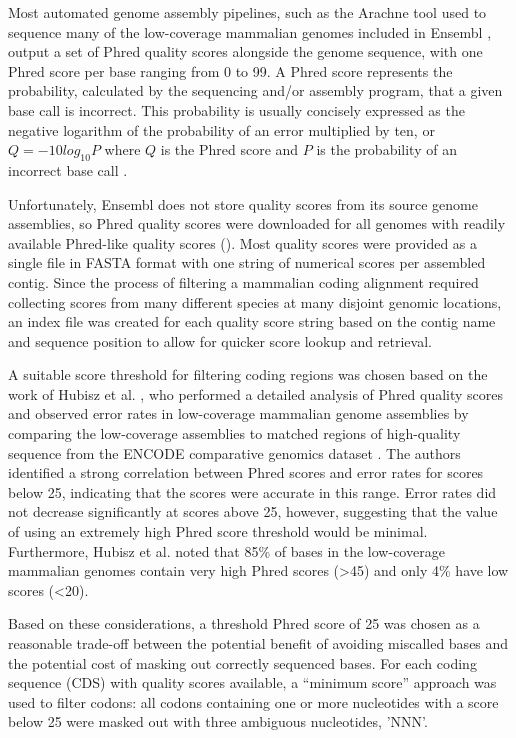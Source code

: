Most automated genome assembly pipelines, such as the Arachne tool
used to sequence many of the low-coverage mammalian genomes included
in Ensembl \citep{Jaffe2003}, output a set of Phred quality scores
alongside the genome sequence, with one Phred score per base ranging
from 0 to 99. A Phred score represents the probability, calculated by
the sequencing and/or assembly program, that a given base call is
incorrect. This probability is usually concisely expressed as the
negative logarithm of the probability of an error multiplied by ten,
or $Q = -10log_{10}P$ where $Q$ is the Phred score and $P$ is the
probability of an incorrect base call \citep{Cock2010}.

Unfortunately, Ensembl does not store quality scores from its source
genome assemblies, so Phred quality scores were downloaded for all
genomes with readily available Phred-like quality scores (). Most quality
scores were provided as a single file in FASTA format with one string
of numerical scores per assembled contig. Since the process of
filtering a mammalian coding alignment required collecting scores from
many different species at many disjoint genomic locations, an index
file was created for each quality score string based on the contig
name and sequence position to allow for quicker score lookup and
retrieval.

A suitable score threshold for filtering coding regions was chosen
based on the work of Hubisz et al. \citeyearpar{Hubisz2011}, who
performed a detailed analysis of Phred quality scores and observed
error rates in low-coverage mammalian genome assemblies by comparing
the low-coverage assemblies to matched regions of high-quality
sequence from the ENCODE comparative genomics dataset
\citep{ENCODE_Project_Consortium2007a}. The authors identified a
strong correlation between Phred scores and error rates for scores
below 25, indicating that the scores were accurate in this
range. Error rates did not decrease significantly at scores above 25,
however, suggesting that the value of using an extremely high Phred
score threshold would be minimal. Furthermore, Hubisz et al. noted
that 85\% of bases in the low-coverage mammalian genomes contain very
high Phred scores (>45) and only 4\% have low scores (<20).

Based on these considerations, a threshold Phred score of 25 was
chosen as a reasonable trade-off between the potential benefit of
avoiding miscalled bases and the potential cost of masking out
correctly sequenced bases. For each coding sequence (CDS) with quality
scores available, a ``minimum score'' approach was used to filter
codons: all codons containing one or more nucleotides with a score
below 25 were masked out with three ambiguous nucleotides,
'NNN'.

